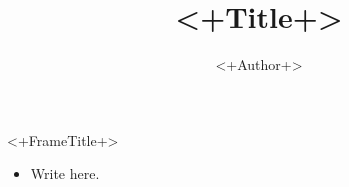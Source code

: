 \documentclass{beamer}
\title{<+Title+>}
\author{<+Author+>}
\begin{document}
\maketitle

\begin{frame}{<+FrameTitle+>}

	\begin{itemize}
		\item Write here.
	\end{itemize}
	
\end{frame}
\end{document}

